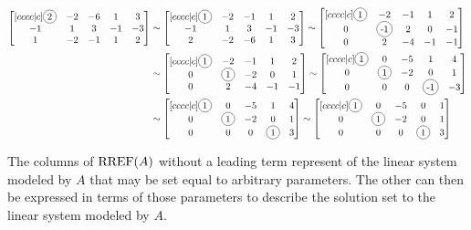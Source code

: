 \begin{applicationActivities}{3}{5}
\begin{observation}
\begin{small}
\begin{align*}
\begin{bmatrix}[cccc|c]
\circledNumber{2} & -2 & -6 & 1 & 3 \\
-1 & 1 & 3 & -1 & -3 \\
1 & -2 & -1 & 1 & 2
\end{bmatrix}
&\sim
\begin{bmatrix}[cccc|c]
\circledNumber{1} & -2 & -1 & 1 & 2 \\
-1 & 1 & 3 & -1 & -3 \\
2 & -2 & -6 & 1 & 3
\end{bmatrix} \sim
\begin{bmatrix}[cccc|c]
\circledNumber{1} & -2 & -1 & 1 & 2 \\
0 & \circledNumber{-1} & 2 & 0 & -1 \\
0 & 2 & -4 & -1 & -1
\end{bmatrix} \\
&\sim
\begin{bmatrix}[cccc|c]
\circledNumber{1} & -2 & -1 & 1 & 2 \\
0 & \circledNumber{1} & -2 & 0  & 1 \\
0 & 2 & -4 & -1 & -1
\end{bmatrix}
\sim
\begin{bmatrix}[cccc|c]
\circledNumber{1} & 0 & -5 & 1 & 4 \\
0 & \circledNumber{1} & -2 & 0  & 1 \\
0 & 0 & 0 & \circledNumber{-1} & -3
\end{bmatrix}  \\
&\sim
\begin{bmatrix}[cccc|c]
\circledNumber{1} & 0 & -5 & 1 & 4 \\
0 & \circledNumber{1} & -2 & 0  & 1 \\
0 & 0 & 0 & \circledNumber{1} & 3
\end{bmatrix}
\sim
\begin{bmatrix}[cccc|c]
\circledNumber{1} & 0 & -5 & 0 & 1 \\
0 & \circledNumber{1} & -2 & 0  & 1 \\
0 & 0 & 0 & \circledNumber{1} & 3
\end{bmatrix}
\end{align*}
\end{small}

\end{observation}

\begin{definition}
  The columns of \(\operatorname{RREF}(A)\) without a leading term represent
   of the linear system modeled by \(A\)
  that may be set equal to arbitrary parameters.
  The other  can then be expressed in terms
  of those parameters to describe the solution set
  to the linear system modeled by \(A\).
\end{definition}


\end{applicationActivities}
